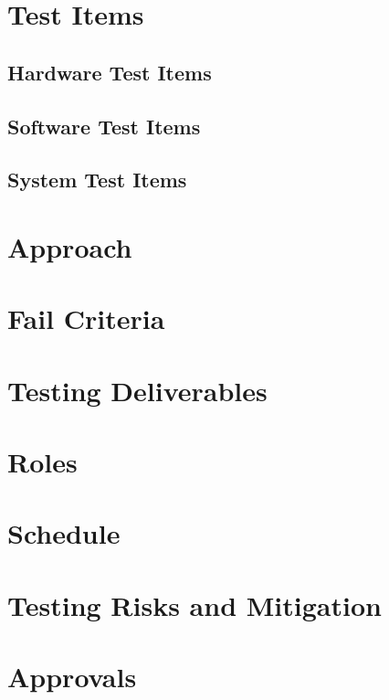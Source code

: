 \documentclass[english,12pt]{article}
\begin{document}


\section{Test Items}
\subsection{Hardware Test Items}
\subsection{Software Test Items}
\subsection{System Test Items}




\section{Approach}


\section{Fail Criteria}

\section{Testing Deliverables}

\section{Roles}

\section{Schedule}

\section{Testing Risks and Mitigation}

\section{Approvals}
\end{document}
